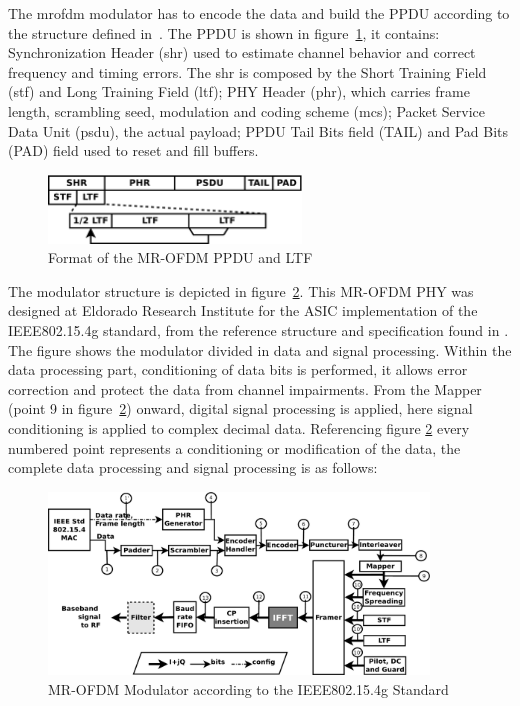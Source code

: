 The \ac{mrofdm} modulator has to encode the data and build the PPDU 
according to the structure defined in~\cite{sun_std_2012}. The PPDU is 
shown in figure~\ref{fig:ofdm_ppdu_ltf}, it contains: Synchronization 
Header (\ac{shr}) used to estimate channel behavior and correct frequency and timing errors. The \ac{shr} is composed by the Short Training Field (\ac{stf}) and Long
Training Field (\ac{ltf}); PHY Header (\ac{phr}), which carries frame 
length, scrambling seed, modulation and coding scheme (\ac{mcs}); Packet
Service Data Unit (\ac{psdu}), the actual payload; PPDU Tail Bits 
field (TAIL) and Pad Bits (PAD) field used to reset and fill buffers. 

\begin{figure}[hbt]
  \centering
    \includegraphics[width=0.6\textwidth]
     {./figuras/ofdm_ppdu_ltf}
  \caption{Format of the MR-OFDM PPDU and LTF}
  \label{fig:ofdm_ppdu_ltf}
\end{figure}


The modulator structure is depicted in figure~\ref{fig:ofdm_tx}. This MR-OFDM PHY was designed at Eldorado Research Institute for the ASIC implementation of the IEEE802.15.4g standard, from the reference structure and specification found in \cite{sun_std_2012}. The figure shows the 
modulator divided in data and signal processing. Within the data processing part, conditioning of data bits is performed, it allows error correction and protect the data from channel impairments. From the 
Mapper (point 9 in figure~\ref{fig:ofdm_tx}) onward, digital signal processing is applied, here
signal conditioning is applied to complex decimal data. Referencing figure \ref{fig:ofdm_tx} every numbered point represents  a conditioning or modification of the data, the complete data processing and signal processing is as follows:

\begin{figure}[hbt]
  \centering
    \includegraphics[width=0.9\textwidth]
      {./figures/OFDM_TX_V4_2}
  \caption{MR-OFDM Modulator according to the IEEE802.15.4g Standard}
  \label{fig:ofdm_tx}
\end{figure}


